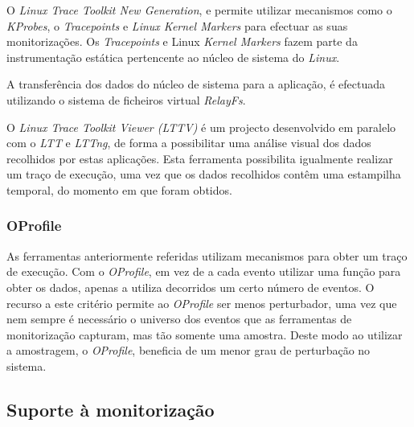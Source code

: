 
O \textit{Linux Trace Toolkit New Generation}, e permite utilizar mecanismos como o \textit{KProbes}, o \textit{Tracepoints}\cite{Mathieu2009} e \textit{Linux Kernel Markers}\cite{Mathieu2009} para efectuar as suas monitorizações.
Os \textit{Tracepoints} e Linux \textit{Kernel Markers} fazem parte da instrumentação estática pertencente ao núcleo de sistema do \textit{Linux}.

A transferência dos dados do núcleo de sistema para a aplicação, é efectuada utilizando o sistema de ficheiros virtual \textit{RelayFs}.


O \textit{Linux Trace Toolkit Viewer (LTTV)} é um projecto desenvolvido em paralelo com o \textit{LTT} e \textit{LTTng}, de forma a possibilitar uma análise visual dos dados recolhidos por estas aplicações.
Esta ferramenta possibilita igualmente realizar um traço de execução, uma vez que os dados recolhidos contêm uma estampilha temporal, do momento em que foram obtidos.
 
\subsubsection{OProfile}\label{cap:Oprofile_overview}
As ferramentas anteriormente referidas utilizam mecanismos para obter um traço de execução.
Com o \textit{OProfile}, em vez de a cada evento utilizar uma função para obter os dados, apenas a utiliza decorridos um certo número de eventos.
O recurso a este critério permite ao \textit{OProfile} ser menos perturbador, uma vez que nem sempre é necessário o universo dos eventos que as ferramentas de monitorização capturam, mas tão somente uma amostra.
Deste modo ao utilizar a amostragem, o \textit{OProfile}, beneficia de um menor grau de perturbação no sistema\cite{Will:TuninProgrOProf}.


\subsection{Suporte à monitorização}

